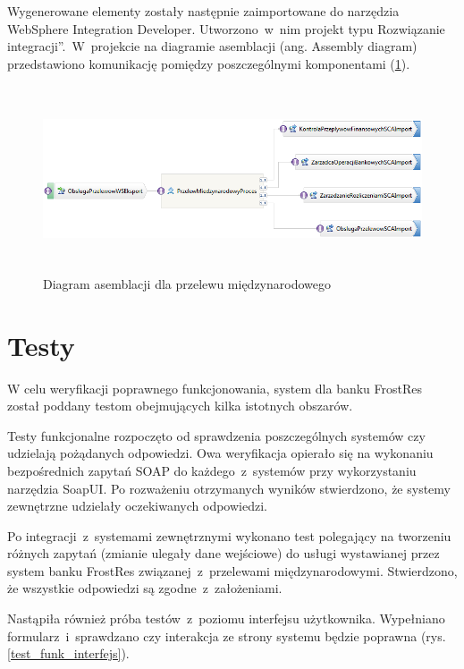 Wygenerowane elementy zostały następnie zaimportowane do narzędzia WebSphere Integration Developer. Utworzono~w~nim projekt typu \quotedblbase Rozwiązanie integracji\textquotedblright.~W~projekcie na diagramie asemblacji (ang. Assembly diagram) przedstawiono komunikację pomiędzy poszczególnymi komponentami (\ref{komponenty_inbound_outbound}).  

\begin{figure}[h!tbp]
\begin{centering}
\includegraphics[width=15cm, height=5.5cm]{img/komponenty_inbound_outbound.png}
\caption[Diagram asemblacji dla przelewu międzynarodowego]{Diagram asemblacji dla przelewu międzynarodowego}\label{komponenty_inbound_outbound}
\end{centering}
\end{figure}


\section{Testy}
W celu weryfikacji poprawnego funkcjonowania, system dla banku FrostRes został poddany testom obejmujących kilka istotnych obszarów.

Testy funkcjonalne rozpoczęto od sprawdzenia poszczególnych systemów czy udzielają pożądanych odpowiedzi. Owa weryfikacja opierało się na wykonaniu bezpośrednich zapytań SOAP do każdego~z~systemów przy wykorzystaniu narzędzia SoapUI. Po rozważeniu otrzymanych wyników stwierdzono, że systemy zewnętrzne udzielały oczekiwanych odpowiedzi.

Po integracji~z~systemami zewnętrznymi wykonano test polegający na tworzeniu różnych zapytań (zmianie ulegały dane wejściowe) do usługi wystawianej przez system banku FrostRes związanej~z~przelewami międzynarodowymi. Stwierdzono, że wszystkie odpowiedzi są zgodne~z~założeniami.

Nastąpiła również próba testów~z~poziomu interfejsu użytkownika. Wypełniano formularz~i~sprawdzano czy interakcja ze strony systemu będzie poprawna (rys. \ref{test_funk_interfejs}). 

